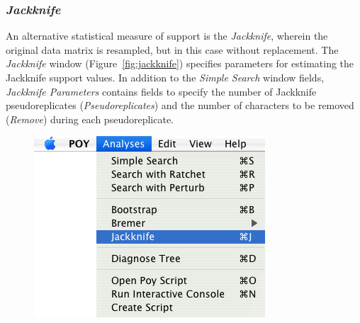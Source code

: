{\subsubsection*{\emph{Jackknife}}

An alternative statistical measure of support is the \emph{Jackknife}, wherein the original data matrix is resampled, but in this case without replacement.  The \emph{Jackknife} window (Figure~\ref{fig:jackknife}) specifies parameters for estimating the
Jackknife support values. In addition to the \emph{Simple Search} window fields, \emph{Jackknife Parameters} contains fields to specify
the number of Jackknife pseudoreplicates (\emph{Pseudoreplicates}) and the number of characters to be removed (\emph{Remove}) during each pseudoreplicate.

\begin{figure}
\centering
\begin{minipage}[c]{0.45\textwidth}
   		\includegraphics[width=\textwidth]{doc/figures/jackknife_menu.jpg}
\end{minipage}
\,
\begin{minipage}[c]{0.52\textwidth}

\end{minipage}
\end{figure}}
